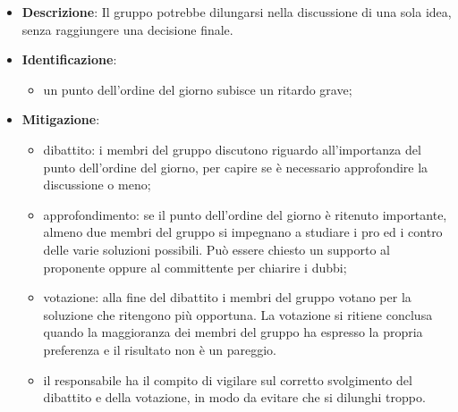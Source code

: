 \label{risk:conflitti decisionali}
\begin{itemize}
	\item \textbf{Descrizione}:
	      Il gruppo potrebbe dilungarsi nella discussione di una sola idea, senza
	      raggiungere una decisione finale.
	\item \textbf{Identificazione}:
	      \begin{itemize}
		      \item un punto dell'ordine del giorno subisce un ritardo grave;
	      \end{itemize}
	\item \textbf{Mitigazione}:
	      \begin{itemize}
		      \item dibattito: i membri del gruppo discutono riguardo
		            all'importanza del punto dell'ordine del giorno, per capire se
		            è necessario approfondire la discussione o meno;

		      \item approfondimento: se il punto dell'ordine del giorno è
		            ritenuto importante, almeno due membri del gruppo si impegnano
		            a studiare i pro ed i contro delle varie soluzioni possibili.
		            Può essere chiesto un supporto al proponente oppure al
		            committente per chiarire i dubbi;

		      \item votazione: alla fine del dibattito i membri del gruppo
		            votano per la soluzione che ritengono più opportuna. La
		            votazione si ritiene conclusa quando la maggioranza dei
		            membri del gruppo ha espresso la propria preferenza e il
		            risultato non è un pareggio.

		      \item il responsabile ha il compito di vigilare sul corretto
		            svolgimento del dibattito e della votazione, in modo da
		            evitare che si dilunghi troppo.
	      \end{itemize}
\end{itemize}
